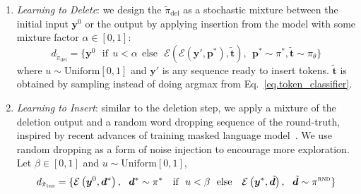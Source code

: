 \documentclass{article}
\begin{document}
\begin{enumerate}[leftmargin=*]
    \item \textit{Learning to Delete}: we design the $\tilde{\pi}_\textrm{del}$ as a stochastic mixture between the initial input $\bm{y}^0$ or the output by applying insertion from the model with some mixture factor $\alpha \in [0, 1]$:
        \begin{equation}
            d_{\tilde{\pi}_\textrm{del}} = \{
            \bm{y}^0 \ \ \ \text{if} \ \ u  < \alpha  \ \ \text{else} \ \ \ \mathcal{E}\left(\mathcal{E}\left(\bm{y}', \bm{p}^*\right), \tilde{\bm{t}}\right), \ \ \bm{p}^* \sim \pi^*, \tilde{\bm{t}} \sim \pi_\theta
            \}
        \label{eq.learn.delete}
        \end{equation}
        where $u \sim \text{Uniform}[0, 1]$ and $\bm{y}'$ is any sequence ready to insert tokens. 
$\tilde{\bm{t}}$ is obtained by sampling instead of doing argmax from Eq.~\eqref{eq.token_classifier}.
    \item \textit{Learning to Insert}: similar to the deletion step, we apply a mixture of the deletion output and a random word dropping sequence of the round-truth, inspired by recent advances of training masked language model~\citep{devlin2018bert}.
We use random dropping as a form of noise injection to encourage more exploration. 
Let $\beta \in [0, 1]$ and $u \sim \text{Uniform}[0, 1]$,
        \begin{equation}
        d_{\tilde{\pi}_\textrm{ins}} = \{
            \mathcal{E}\left(\bm{y}^0, \bm{d}^*\right), \ \ \bm{d}^* \sim \pi^* \ \ \ \text{if} \ \ u  < \beta  \ \ \text{else} \
            \ \ \mathcal{E}\left(\bm{y}^*, \tilde{\bm{d}} \right), \ \ \tilde{\bm{d}} \sim \pi^\textsc{rnd}
        \}
        \label{eq.learn.insert}
        \end{equation}


\end{enumerate}
\end{document}
